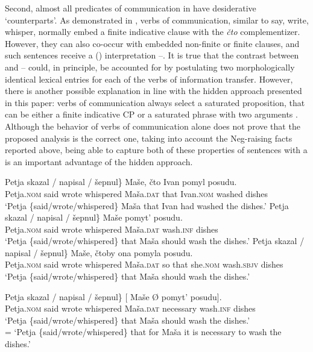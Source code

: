 \documentclass[output=paper,colorlinks,citecolor=brown,newtxmath]{langsci/langscibook}
\begin{document}
Second, almost all predicates of communication in  have desiderative `counterparts’. As demonstrated in ,  verbs of communication, similar to  say, write, whisper, normally embed a finite indicative clause with the \textit{čto} complementizer. However, they can also co-occur with embedded non-finite or finite  clauses, and such sentences receive a  () interpretation --. It is true that the contrast between  and -- could, in principle, be accounted for by postulating two morphologically identical lexical entries for each of the verbs of information transfer. However, there is another possible explanation in line with the hidden  approach presented in this paper: verbs of communication always select a saturated proposition, that can be either a finite indicative CP or a saturated  phrase with two arguments . Although the behavior of verbs of communication alone does not prove that the proposed analysis is the correct one, taking into account the Neg-raising facts reported above, being able to capture both of these properties of sentences with a  is an important advantage of the hidden  approach.


\ea\label{ex17}
\ea\label{ex17a}
\gll Petja \minsp{\{} skazal / napisal / šepnul\} Maše, čto Ivan pomyl posudu.\\
    Petja.\textsc{nom} {} said {} wrote {} whispered Maša.\textsc{dat} that Ivan.\textsc{nom} washed dishes\\
\glt `Petja \{said/wrote/whispered\} Maša that Ivan had washed the dishes.'
\ex\label{ex17b}
\gll Petja \minsp{\{} skazal / napisal / šepnul\} Maše pomyt’ posudu.\\
    Petja.\textsc{nom} {} said {} wrote {} whispered Maša.\textsc{dat} wash.\textsc{inf} dishes\\
\glt `Petja \{said/wrote/whispered\} that Maša should wash the dishes.'
\ex\label{ex17c}
\gll Petja \minsp{\{} skazal / napisal / šepnul\} Maše, čtoby ona pomyla posudu.\\
    Petja.\textsc{nom} {} said {} wrote {} whispered Maša.\textsc{dat} {so that} she.\textsc{nom} wash.\textsc{sbjv} dishes\\
\glt `Petja \{said/wrote/whispered\} that Maša should wash the dishes.'
\z
\z

\ea\label{ex18}
\gll Petja	\minsp{\{} skazal / napisal / šepnul\} [\hspace{-2pt} Maše Ø pomyt’ posudu].\\
    Petja.\textsc{nom} {} said {} wrote {} whispered {} Maša.\textsc{dat} necessary wash.\textsc{inf} dishes\\
\glt `Petja \{said/wrote/whispered\} that Maša should wash the dishes.' \\
= `Petja \{said/wrote/whispered\} that for Maša it is necessary to wash the dishes.'
\z
\end{document}
